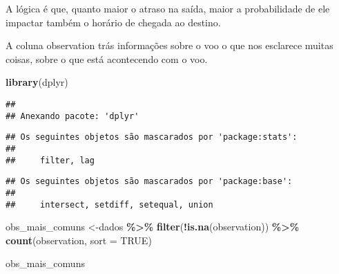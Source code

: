 \documentclass[
]{article}
\newenvironment{Shaded}{\begin{snugshade}}{\end{snugshade}}
\newcommand{\AttributeTok}[1]{\textcolor[rgb]{0.13,0.29,0.53}{#1}}
\newcommand{\ConstantTok}[1]{\textcolor[rgb]{0.56,0.35,0.01}{#1}}
\newcommand{\FunctionTok}[1]{\textcolor[rgb]{0.13,0.29,0.53}{\textbf{#1}}}
\newcommand{\NormalTok}[1]{#1}
\newcommand{\OtherTok}[1]{\textcolor[rgb]{0.56,0.35,0.01}{#1}}
\newcommand{\SpecialCharTok}[1]{\textcolor[rgb]{0.81,0.36,0.00}{\textbf{#1}}}
\begin{document}
A lógica é que, quanto maior o atraso na saída, maior a probabilidade de
ele impactar também o horário de chegada ao destino.

A coluna observation trás informações sobre o voo o que nos esclarece
muitas coisas, sobre o que está acontecendo com o voo.

\begin{Shaded}
\begin{Highlighting}[]
\FunctionTok{library}\NormalTok{(dplyr)}
\end{Highlighting}
\end{Shaded}

\begin{verbatim}
## 
## Anexando pacote: 'dplyr'
\end{verbatim}

\begin{verbatim}
## Os seguintes objetos são mascarados por 'package:stats':
## 
##     filter, lag
\end{verbatim}

\begin{verbatim}
## Os seguintes objetos são mascarados por 'package:base':
## 
##     intersect, setdiff, setequal, union
\end{verbatim}

\begin{Shaded}
\begin{Highlighting}[]
\NormalTok{obs\_mais\_comuns }\OtherTok{\textless{}{-}}\NormalTok{dados }\SpecialCharTok{\%\textgreater{}\%}
  \FunctionTok{filter}\NormalTok{(}\SpecialCharTok{!}\FunctionTok{is.na}\NormalTok{(observation)) }\SpecialCharTok{\%\textgreater{}\%}
  \FunctionTok{count}\NormalTok{(observation, }\AttributeTok{sort =} \ConstantTok{TRUE}\NormalTok{) }

\NormalTok{obs\_mais\_comuns}
\end{Highlighting}
\end{Shaded}
\end{document}
